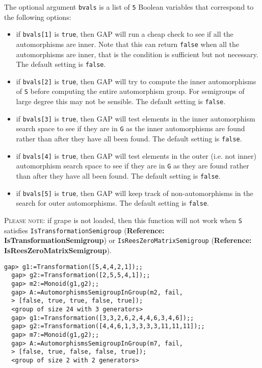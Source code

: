 \documentclass[a4paper,11pt]{report}
\begin{document}
{{{ The optional argument \texttt{bvals} is a list of \texttt{5} Boolean variables that correspond to the following options: 
\begin{itemize}
\item if \texttt{bvals[1]} is \texttt{true}, then \textsf{GAP} will run a cheap check to see if all the automorphisms are inner. Note that
this can return \texttt{false} when all the automorphisms are inner, that is the condition is sufficient but
not necessary. The default setting is \texttt{false}. 
\item if \texttt{bvals[2]} is \texttt{true}, then \textsf{GAP} will try to compute the inner automorphisms of \texttt{S} before computing the entire automorphism group. For semigroups of large degree
this may not be sensible. The default setting is \texttt{false}.
\item if \texttt{bvals[3]} is \texttt{true}, then \textsf{GAP} will test elements in the inner automorphism search space to see if they are
in \texttt{G} as the inner automorphisms are found rather than after they have all been
found. The default setting is \texttt{false}.
\item if \texttt{bvals[4]} is \texttt{true}, then \textsf{GAP} will test elements in the outer (i.e. not inner) automorphism search space to
see if they are in \texttt{G} as they are found rather than after they have all been found. The default
setting is \texttt{false}.
\item if \texttt{bvals[5]} is \texttt{true}, then \textsf{GAP} will keep track of non-automorphisms in the search for outer automorphisms.
The default setting is \texttt{false}.
\end{itemize}
 \textsc{Please note:} if \textsf{grape} is not loaded, then this function will not work when \texttt{S} satisfies \texttt{IsTransformationSemigroup} (\textbf{Reference: IsTransformationSemigroup}) or \texttt{IsReesZeroMatrixSemigroup} (\textbf{Reference: IsReesZeroMatrixSemigroup}). 
\begin{Verbatim}[fontsize=\small,frame=single,label=Example]
  gap> g1:=Transformation([5,4,4,2,1]);;
  gap> g2:=Transformation([2,5,5,4,1]);;
  gap> m2:=Monoid(g1,g2);;
  gap> A:=AutomorphismsSemigroupInGroup(m2, fail, 
  > [false, true, true, false, true]);
  <group of size 24 with 3 generators>
  gap> g1:=Transformation([3,3,2,6,2,4,4,6,3,4,6]);;
  gap> g2:=Transformation([4,4,6,1,3,3,3,3,11,11,11]);;
  gap> m7:=Monoid(g1,g2);;
  gap> A:=AutomorphismsSemigroupInGroup(m7, fail, 
  > [false, true, false, false, true]);
  <group of size 2 with 2 generators>

\end{Verbatim}}}}
\end{document}
